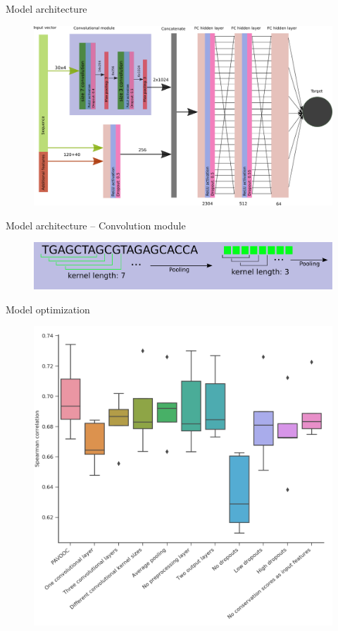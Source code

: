 \documentclass[Nike]{tuberlinbeamer}
\begin{document}
\begin{frame}{Model architecture}
  \begin{figure}
    \includegraphics[width=0.9\linewidth]{CNN38_layout.png}
  \end{figure}
\end{frame}

\begin{frame}{Model architecture -- Convolution module}
  \vspace{2.0cm}
  \begin{figure}
    \includegraphics[width=0.8\linewidth]{convolution.png}
  \end{figure}
\end{frame}

\begin{frame}{Model optimization}
  \vspace{-0.3cm}
  \begin{figure}
    \includegraphics[width=0.57\linewidth]{cnn38_saturation.png}
  \end{figure}

\end{frame}
\end{document}

